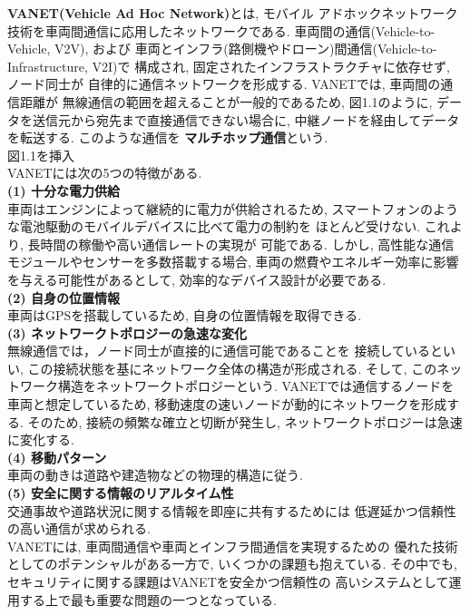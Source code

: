 \textbf{VANET(Vehicle Ad Hoc Network)}とは, モバイル
アドホックネットワーク技術を車両間通信に応用したネットワークである. 
\cite{adhoc, vanet} 車両間の通信(Vehicle-to-Vehicle, V2V), および
車両とインフラ(路側機やドローン)間通信(Vehicle-to-Infrastructure, V2I)\cite{drone}で
構成され, 固定されたインフラストラクチャに依存せず, ノード同士が
自律的に通信ネットワークを形成する. VANETでは, 車両間の通信距離が
無線通信の範囲を超えることが一般的であるため, 図1.1のように, 
データを送信元から宛先まで直接通信できない場合に, 
中継ノードを経由してデータを転送する. このような通信を
\textbf{マルチホップ通信}という.\\


{\Huge 図1.1を挿入}\\

VANETには次の5つの特徴がある.\\[0.5em]
\noindent\textbf{(1) 十分な電力供給}\\
\indent 車両はエンジンによって継続的に電力が供給されるため, 
スマートフォンのような電池駆動のモバイルデバイスに比べて電力の制約を
ほとんど受けない. これより, 長時間の稼働や高い通信レートの実現が
可能である. しかし, 高性能な通信モジュールやセンサーを多数搭載する場合, 
車両の燃費やエネルギー効率に影響を与える可能性があるとして, 
効率的なデバイス設計が必要である.\\[1em]
\noindent\textbf{(2) 自身の位置情報}\\
\indent 車両はGPSを搭載しているため,  自身の位置情報を取得できる.\\[1em]
\noindent\textbf{(3) ネットワークトポロジーの急速な変化}\\
\indent 無線通信では，ノード同士が直接的に通信可能であることを
接続しているといい, この接続状態を基にネットワーク全体の構造が形成される.
そして, このネットワーク構造をネットワークトポロジーという. 
VANETでは通信するノードを車両と想定しているため, 
移動速度の速いノードが動的にネットワークを形成する. 
そのため, 接続の頻繁な確立と切断が発生し, 
ネットワークトポロジーは急速に変化する. \\[1em]
\noindent\textbf{(4) 移動パターン}\\
\indent 車両の動きは道路や建造物などの物理的構造に従う.\\[1em]
\noindent\textbf{(5) 安全に関する情報のリアルタイム性}\\
交通事故や道路状況に関する情報を即座に共有するためには 
低遅延かつ信頼性の高い通信が求められる.\\

VANETには, 車両間通信や車両とインフラ間通信を実現するための
優れた技術としてのポテンシャルがある一方で, 
いくつかの課題も抱えている.
その中でも, セキュリティに関する課題はVANETを安全かつ信頼性の
高いシステムとして運用する上で最も重要な問題の一つとなっている.
\cite{vanet-challenge,vanet-security}\\

